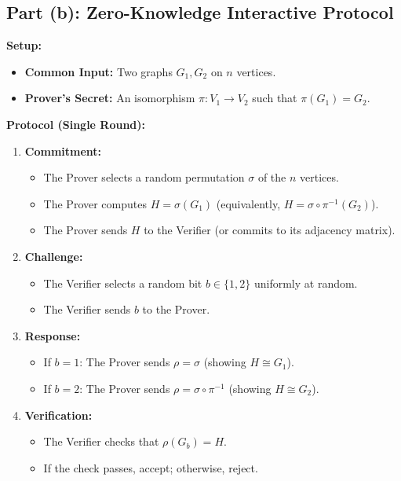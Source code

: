 \documentclass[11pt]{article}
\begin{document}
\subsection{Part (b): Zero-Knowledge Interactive Protocol}

\textbf{Setup:}
\begin{itemize}
    \item \textbf{Common Input:} Two graphs $G_1, G_2$ on $n$ vertices.
    \item \textbf{Prover's Secret:} An isomorphism $\pi: V_1 \to V_2$ such that $\pi(G_1) = G_2$.
\end{itemize}

\textbf{Protocol (Single Round):}
\begin{enumerate}
    \item \textbf{Commitment:}
    \begin{itemize}
        \item The Prover selects a random permutation $\sigma$ of the $n$ vertices.
        \item The Prover computes $H = \sigma(G_1)$ (equivalently, $H = \sigma \circ \pi^{-1}(G_2)$).
        \item The Prover sends $H$ to the Verifier (or commits to its adjacency matrix).
    \end{itemize}
    
    \item \textbf{Challenge:}
    \begin{itemize}
        \item The Verifier selects a random bit $b \in \{1, 2\}$ uniformly at random.
        \item The Verifier sends $b$ to the Prover.
    \end{itemize}
    
    \item \textbf{Response:}
    \begin{itemize}
        \item If $b = 1$: The Prover sends $\rho = \sigma$ (showing $H \cong G_1$).
        \item If $b = 2$: The Prover sends $\rho = \sigma \circ \pi^{-1}$ (showing $H \cong G_2$).
    \end{itemize}
    
    \item \textbf{Verification:}
    \begin{itemize}
        \item The Verifier checks that $\rho(G_b) = H$.
        \item If the check passes, accept; otherwise, reject.
    \end{itemize}
\end{enumerate}
\end{document}
